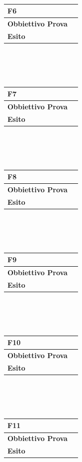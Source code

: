 \documentclass[11pt,titlepage,a4paper]{report}
\begin{document}
\\
\begin{tabular}{||p{4.5cm}||p{7.5cm}||}
\hline
\textbf{\textsf{F6}}& \\
\hline
{\textbf {Obbiettivo Prova}}& \\ \hline
{\textbf{Esito}}&  \\ \hline
\end{tabular} \\
\\
\\
\begin{tabular}{||p{4.5cm}||p{7.5cm}||}
\hline
\textbf{\textsf{F7}}& \\
\hline
{\textbf {Obbiettivo Prova}}& \\ \hline
{\textbf{Esito}}&  \\ \hline
\end{tabular} \\
\\
\\
\begin{tabular}{||p{4.5cm}||p{7.5cm}||}
\hline
\textbf{\textsf{F8}}& \\
\hline
{\textbf {Obbiettivo Prova}}& \\ \hline
{\textbf{Esito}}&  \\ \hline
\end{tabular} \\
\\
\\
\begin{tabular}{||p{4.5cm}||p{7.5cm}||}
\hline
\textbf{\textsf{F9}} \\
\hline
{\textbf {Obbiettivo Prova}}& \\ \hline
{\textbf{Esito}}&  \\ \hline
\end{tabular} \\
\\
\\
\begin{tabular}{||p{4.5cm}||p{7.5cm}||}
\hline
\textbf{\textsf{F10}} \\
\hline
{\textbf {Obbiettivo Prova}}& \\ \hline
{\textbf{Esito}}&  \\ \hline
\end{tabular} \\
\\
\\
\begin{tabular}{||p{4.5cm}||p{7.5cm}||}
\hline
\textbf{\textsf{F11}} \\
\hline
{\textbf {Obbiettivo Prova}}& \\ \hline
{\textbf{Esito}}&  \\ \hline
\end{tabular} \\
\end{document}
